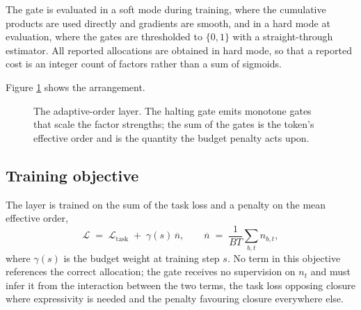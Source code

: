 The gate is evaluated in a soft mode during training, where the cumulative
products are used directly and gradients are smooth, and in a hard mode at
evaluation, where the gates are thresholded to $\{0,1\}$ with a straight-through
estimator. All reported allocations are obtained in hard mode, so that a reported
cost is an integer count of factors rather than a sum of sigmoids.

Figure \ref{fig:mechanism} shows the arrangement.

\begin{figure}[ht]
	\centering
	\caption{The adaptive-order layer. The halting gate emits monotone gates that scale the factor strengths; the sum of the gates is the token's effective order and is the quantity the budget penalty acts upon.}
	\label{fig:mechanism}
\end{figure}

\subsection{Training objective}

The layer is trained on the sum of the task loss and a penalty on the mean
effective order,
\begin{equation}
\mathcal{L} \;=\; \mathcal{L}_{\text{task}} \;+\; \gamma(s)\,\overline{n},
\qquad
\overline{n} \;=\; \frac{1}{BT}\sum_{b,t} n_{b,t},
\end{equation}
where $\gamma(s)$ is the budget weight at training step $s$. No term in this
objective references the correct allocation; the gate receives no supervision on
$n_t$ and must infer it from the interaction between the two terms, the task loss
opposing closure where expressivity is needed and the penalty favouring closure
everywhere else.

